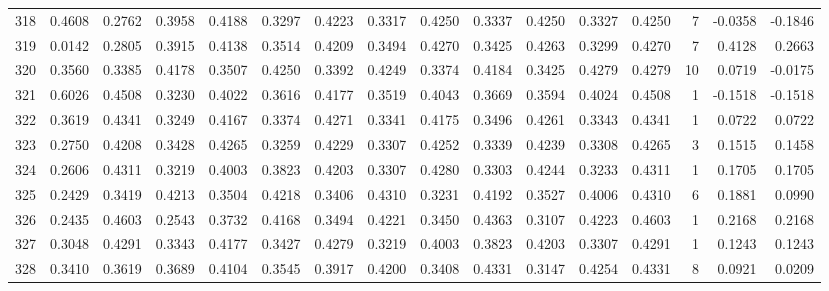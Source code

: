 \begin{tabular}{lrrrrrrrrrrrrrrr}
318 &      0.4608 &  0.2762 &  0.3958 &  0.4188 &  0.3297 &  0.4223 &  0.3317 &  0.4250 &  0.3337 &  0.4250 &   0.3327 &     0.4250 &      7 &                   -0.0358 &                    -0.1846 \\
319 &      0.0142 &  0.2805 &  0.3915 &  0.4138 &  0.3514 &  0.4209 &  0.3494 &  0.4270 &  0.3425 &  0.4263 &   0.3299 &     0.4270 &      7 &                    0.4128 &                     0.2663 \\
320 &      0.3560 &  0.3385 &  0.4178 &  0.3507 &  0.4250 &  0.3392 &  0.4249 &  0.3374 &  0.4184 &  0.3425 &   0.4279 &     0.4279 &     10 &                    0.0719 &                    -0.0175 \\
321 &      0.6026 &  0.4508 &  0.3230 &  0.4022 &  0.3616 &  0.4177 &  0.3519 &  0.4043 &  0.3669 &  0.3594 &   0.4024 &     0.4508 &      1 &                   -0.1518 &                    -0.1518 \\
322 &      0.3619 &  0.4341 &  0.3249 &  0.4167 &  0.3374 &  0.4271 &  0.3341 &  0.4175 &  0.3496 &  0.4261 &   0.3343 &     0.4341 &      1 &                    0.0722 &                     0.0722 \\
323 &      0.2750 &  0.4208 &  0.3428 &  0.4265 &  0.3259 &  0.4229 &  0.3307 &  0.4252 &  0.3339 &  0.4239 &   0.3308 &     0.4265 &      3 &                    0.1515 &                     0.1458 \\
324 &      0.2606 &  0.4311 &  0.3219 &  0.4003 &  0.3823 &  0.4203 &  0.3307 &  0.4280 &  0.3303 &  0.4244 &   0.3233 &     0.4311 &      1 &                    0.1705 &                     0.1705 \\
325 &      0.2429 &  0.3419 &  0.4213 &  0.3504 &  0.4218 &  0.3406 &  0.4310 &  0.3231 &  0.4192 &  0.3527 &   0.4006 &     0.4310 &      6 &                    0.1881 &                     0.0990 \\
326 &      0.2435 &  0.4603 &  0.2543 &  0.3732 &  0.4168 &  0.3494 &  0.4221 &  0.3450 &  0.4363 &  0.3107 &   0.4223 &     0.4603 &      1 &                    0.2168 &                     0.2168 \\
327 &      0.3048 &  0.4291 &  0.3343 &  0.4177 &  0.3427 &  0.4279 &  0.3219 &  0.4003 &  0.3823 &  0.4203 &   0.3307 &     0.4291 &      1 &                    0.1243 &                     0.1243 \\
328 &      0.3410 &  0.3619 &  0.3689 &  0.4104 &  0.3545 &  0.3917 &  0.4200 &  0.3408 &  0.4331 &  0.3147 &   0.4254 &     0.4331 &      8 &                    0.0921 &                     0.0209 \\

\end{tabular}
